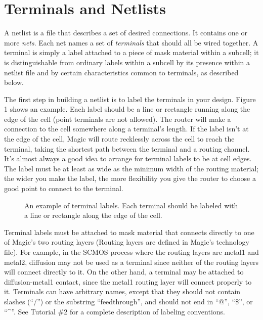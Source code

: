 \documentclass[letterpaper,twoside,12pt]{article}
\begin{document}
\section{Terminals and Netlists}

A netlist is a file that describes a set of desired connections.
It contains one or more {\itshape nets}.  Each net names a
set of {\itshape terminals} that should all be wired together.
A terminal is simply a label attached to a piece of mask material within
a subcell; it is distinguishable from ordinary labels within a subcell by its
presence within a netlist file and by certain characteristics
common to terminals, as described below.

The first step in building a netlist is to label the terminals in
your design.  Figure 1 shows an example.  Each label should
be a line or rectangle running along the edge of the cell (point terminals
are not allowed).
The router will make a connection to the cell somewhere along a
terminal's length.
If the label isn't at the edge of the cell,
Magic will route recklessly across the cell to reach the terminal,
taking the shortest path between the terminal and a routing channel.
It's almost always a good idea to arrange for terminal labels to
be at cell edges.  The label must be at least as wide as the minimum width
of the routing material;  the wider you make the label, the more flexibility
you give the router to choose a good point to connect to the terminal.

\begin{figure}[ht]
   \begin{center}
      \caption{An example of terminal labels.  Each terminal
	should be labeled with a line or rectangle along the
	edge of the cell.}
   \end{center}
\end{figure}

Terminal labels must be attached to mask material that connects
directly to one of Magic's two routing layers (Routing layers are defined
in Magic's technology file).
For example, in the SCMOS process
where the routing layers are metal1 and metal2, diffusion
may not be used as a terminal since neither of the routing
layers will connect directly to it.  On the other hand, a terminal
may be attached to diffusion-metal1 contact, since the metal1 routing layer
will connect properly to it.
Terminals can have arbitrary names, except that they should not
contain slashes (``/'') or the substring ``feedthrough'', and should not
end in ``@'', ``\$'', or ``\^{}''.
See Tutorial \#2 for a complete description of labeling conventions.
\end{document}
